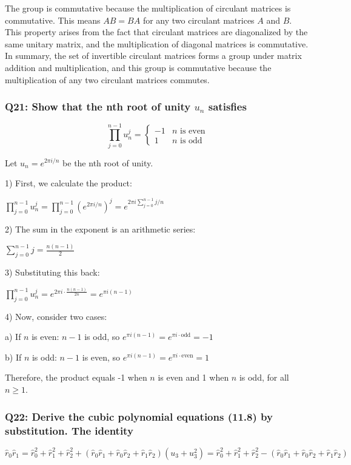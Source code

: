 \documentclass[8pt]{article}
\begin{document}
The group is commutative because the multiplication of circulant matrices is commutative. This means $AB=BA$ for any two circulant matrices $A$ and $B$. This property arises from the fact that circulant matrices are diagonalized by the same unitary matrix, and the multiplication of diagonal matrices is commutative.\\

In summary, the set of invertible circulant matrices forms a group under matrix addition and multiplication, and this group is commutative because the multiplication of any two circulant matrices commutes.

\subsubsection*{Q21: Show that the nth root of unity \(u_n\) satisfies}
\[
\prod_{j=0}^{n-1} u_n^j = 
\begin{cases} 
-1 & n \text{ is even} \\
1 & n \text{ is odd}
\end{cases}
\]

Let $u_n = e^{2\pi i/n}$ be the nth root of unity.

1) First, we calculate the product:

   $\prod_{j=0}^{n-1} u_n^j = \prod_{j=0}^{n-1} (e^{2\pi i/n})^j = e^{2\pi i \sum_{j=0}^{n-1} j/n}$

2) The sum in the exponent is an arithmetic series:

   $\sum_{j=0}^{n-1} j = \frac{n(n-1)}{2}$

3) Substituting this back:

   $\prod_{j=0}^{n-1} u_n^j = e^{2\pi i \cdot \frac{n(n-1)}{2n}} = e^{\pi i (n-1)}$

4) Now, consider two cases:

   a) If $n$ is even:
      $n-1$ is odd, so $e^{\pi i (n-1)} = e^{\pi i \cdot \text{odd}} = -1$

   b) If $n$ is odd:
      $n-1$ is even, so $e^{\pi i (n-1)} = e^{\pi i \cdot \text{even}} = 1$

Therefore, the product equals -1 when $n$ is even and 1 when $n$ is odd, for all $n \ge 1$.

\subsubsection*{Q22: Derive the cubic polynomial equations (11.8) by substitution. The identity}
\[
\hat{r}_0 \hat{r}_1 = \hat{r}_0^2 + \hat{r}_1^2 + \hat{r}_2^2 + (\hat{r}_0 \hat{r}_1 + \hat{r}_0 \hat{r}_2 + \hat{r}_1 \hat{r}_2)(u_3 + u_3^2) = \hat{r}_0^2 + \hat{r}_1^2 + \hat{r}_2^2 - (\hat{r}_0 \hat{r}_1 + \hat{r}_0 \hat{r}_2 + \hat{r}_1 \hat{r}_2)
\]
\end{document}
